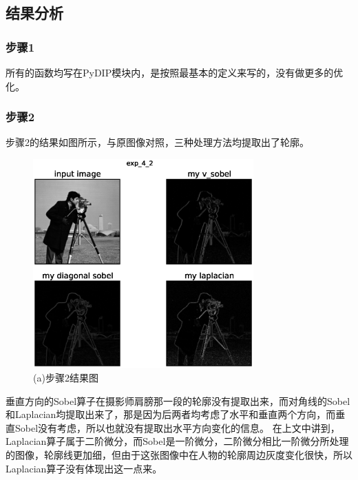 \documentclass[]{IEEEphot}
\begin{document}
\subsection{结果分析}
\subsubsection{步骤1}
所有的函数均写在PyDIP模块内，是按照最基本的定义来写的，没有做更多的优化。
\subsubsection{步骤2}
步骤2的结果如图所示，与原图像对照，三种处理方法均提取出了轮廓。
\begin{figure}[h]
	\centering
	\includegraphics[width=20pc]{exp_4_2.eps}
	\caption{(a)步骤2结果图}
	\label{fig_env1}
\end{figure}
垂直方向的Sobel算子在摄影师肩膀那一段的轮廓没有提取出来，而对角线的Sobel和Laplacian均提取出来了，那是因为后两者均考虑了水平和垂直两个方向，而垂直Sobel没有考虑，所以也就没有提取出水平方向变化的信息。
在上文中讲到，Laplacian算子属于二阶微分，而Sobel是一阶微分，二阶微分相比一阶微分所处理的图像，轮廓线更加细，但由于这张图像中在人物的轮廓周边灰度变化很快，所以Laplacian算子没有体现出这一点来。
\end{document}
